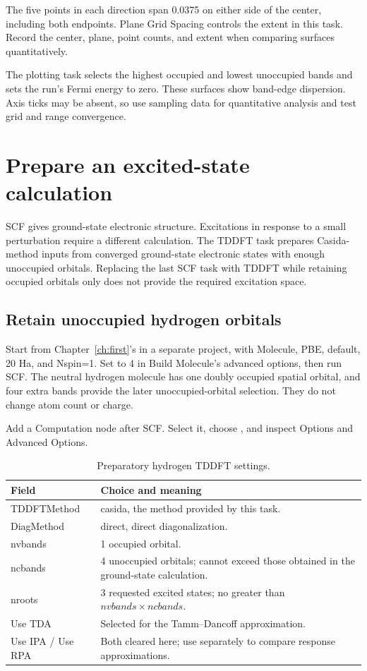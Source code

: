 The five points in each direction span 0.0375 on either side of the center, including both endpoints. Plane Grid Spacing controls the extent in this task. Record the center, plane, point counts, and extent when comparing surfaces quantitatively.

The plotting task selects the highest occupied and lowest unoccupied bands and sets the run's Fermi energy to zero. These surfaces show band-edge dispersion. Axis ticks may be absent, so use sampling data for quantitative analysis and test grid and range convergence.

\section{Prepare an excited-state calculation}\label{sec:tddft-workflow}

SCF gives ground-state electronic structure. Excitations in response to a small perturbation require a different calculation. The TDDFT task prepares Casida-method inputs from converged ground-state electronic states with enough unoccupied orbitals. Replacing the last SCF task with TDDFT while retaining occupied orbitals only does not provide the required excitation space.

\subsection{Retain unoccupied hydrogen orbitals}

Start from Chapter~\ref{ch:first}'s  in a separate project, with Molecule, PBE, default, 20 Ha, and Nspin=1. Set  to 4 in Build Molecule's advanced options, then run SCF. The neutral hydrogen molecule has one doubly occupied spatial orbital, and four extra bands provide the later unoccupied-orbital selection. They do not change atom count or charge.

Add a Computation  node after SCF. Select it, choose , and inspect Options and Advanced Options.

\begin{table}[htbp]
\centering
\caption{Preparatory hydrogen TDDFT settings.}
\begin{tabularx}{\linewidth}{lX}
\toprule
Field & Choice and meaning \\
\midrule
TDDFTMethod & casida, the method provided by this task. \\
DiagMethod & direct, direct diagonalization. \\
nvbands & 1 occupied orbital. \\
ncbands & 4 unoccupied orbitals; cannot exceed those obtained in the ground-state calculation. \\
nroots & 3 requested excited states; no greater than $nvbands\times ncbands$. \\
Use TDA & Selected for the Tamm--Dancoff approximation. \\
Use IPA / Use RPA & Both cleared here; use separately to compare response approximations. \\
\bottomrule
\end{tabularx}
\end{table}

